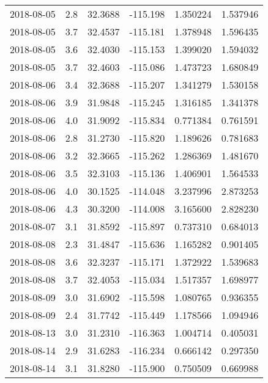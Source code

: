\begin{tabular}{lrrrrr}
2018-08-05 &       2.8 &  32.3688 &  -115.198 &         1.350224 &         1.537946 \\
2018-08-05 &       3.7 &  32.4537 &  -115.181 &         1.378948 &         1.596435 \\
2018-08-05 &       3.6 &  32.4030 &  -115.153 &         1.399020 &         1.594032 \\
2018-08-05 &       3.7 &  32.4603 &  -115.086 &         1.473723 &         1.680849 \\
2018-08-06 &       3.4 &  32.3688 &  -115.207 &         1.341279 &         1.530158 \\
2018-08-06 &       3.9 &  31.9848 &  -115.245 &         1.316185 &         1.341378 \\
2018-08-06 &       4.0 &  31.9092 &  -115.834 &         0.771384 &         0.761591 \\
2018-08-06 &       2.8 &  31.2730 &  -115.820 &         1.189626 &         0.781683 \\
2018-08-06 &       3.2 &  32.3665 &  -115.262 &         1.286369 &         1.481670 \\
2018-08-06 &       3.5 &  32.3103 &  -115.136 &         1.406901 &         1.564533 \\
2018-08-06 &       4.0 &  30.1525 &  -114.048 &         3.237996 &         2.873253 \\
2018-08-06 &       4.3 &  30.3200 &  -114.008 &         3.165600 &         2.828230 \\
2018-08-07 &       3.1 &  31.8592 &  -115.897 &         0.737310 &         0.684013 \\
2018-08-08 &       2.3 &  31.4847 &  -115.636 &         1.165282 &         0.901405 \\
2018-08-08 &       3.6 &  32.3237 &  -115.171 &         1.372922 &         1.539683 \\
2018-08-08 &       3.7 &  32.4053 &  -115.034 &         1.517357 &         1.698977 \\
2018-08-09 &       3.0 &  31.6902 &  -115.598 &         1.080765 &         0.936355 \\
2018-08-09 &       2.4 &  31.7742 &  -115.449 &         1.178566 &         1.094946 \\
2018-08-13 &       3.0 &  31.2310 &  -116.363 &         1.004714 &         0.405031 \\
2018-08-14 &       2.9 &  31.6283 &  -116.234 &         0.666142 &         0.297350 \\
2018-08-14 &       3.1 &  31.8280 &  -115.900 &         0.750509 &         0.669988 \\

\end{tabular}
